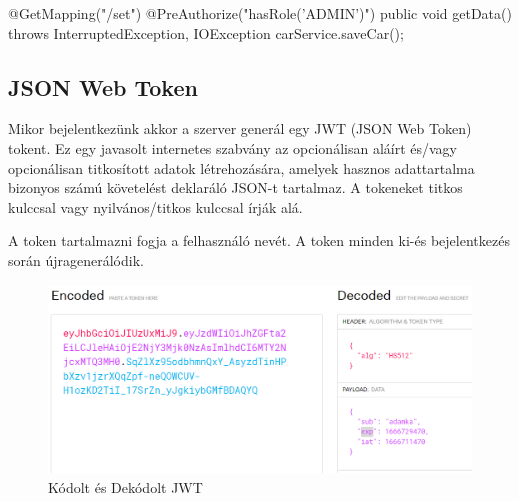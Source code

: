 \begin{java}
@GetMapping("/set")
@PreAuthorize("hasRole('ADMIN')")
public void getData() throws InterruptedException,
IOException {
   carService.saveCar();
}
\end{java}
\newpage

\subsection{JSON Web Token}
Mikor bejelentkezünk akkor a szerver generál egy JWT (JSON Web Token)\cite{JWT} tokent. Ez egy javasolt internetes szabvány az opcionálisan aláírt és/vagy opcionálisan titkosított adatok létrehozására, amelyek hasznos adattartalma bizonyos számú követelést deklaráló JSON-t tartalmaz. A tokeneket titkos kulccsal vagy nyilvános/titkos kulccsal írják alá.

A token tartalmazni fogja a felhasználó nevét. A token minden ki-és bejelentkezés során újragenerálódik. 

\begin{figure}[h]
\centering
\includegraphics[scale=0.6]{images/jwt.io.png}
\caption{Kódolt és Dekódolt JWT \cite{JWTexample}}
\label{fig:JWT}
\end{figure}
